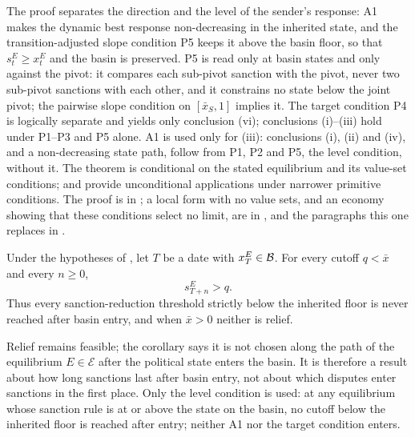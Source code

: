 The proof separates the direction and the level of the sender's response: A1
makes the dynamic best response non-decreasing in the inherited state, and the
transition-adjusted slope condition P5 keeps it above the basin floor, so that
$s_t^E\ge x_t^E$ and the basin is preserved. P5 is read only at basin states
and only against the pivot: it compares each sub-pivot sanction with the pivot,
never two sub-pivot sanctions with each other, and it constrains no state below
the joint pivot; the pairwise slope condition on $[\bar x_S,1]$ implies it. The target
condition P4 is logically
separate and yields only conclusion (vi); conclusions (i)--(iii) hold under
P1--P3 and P5 alone. A1 is used only for (iii): conclusions (i), (ii) and
(iv), and a non-decreasing state path, follow from P1, P2 and P5, the level
condition, without it. The theorem is conditional on the stated equilibrium and
its value-set conditions;  and
 provide unconditional applications under
narrower primitive conditions. The proof is in ; a local form
with no value sets, and an economy showing that these conditions select no limit,
are in , and the paragraphs this one replaces in
.

\begin{corollary}
\label{cor:nontermination}
Under the hypotheses of , let $T$ be a date with
$x_T^E\in\mathcal{B}$. For every cutoff $q<\bar x$ and every $n\ge0$,
\[
s_{T+n}^E>q.
\]
Thus every sanction-reduction threshold strictly below the inherited floor
is never reached after basin entry, and when $\bar x>0$ neither is
relief.
\end{corollary}

Relief remains feasible; the corollary says it is not chosen along the
path of the equilibrium $E\in\mathcal E$ after the political state enters the
basin. It is therefore a result about how long sanctions last after basin entry, not about
which disputes enter sanctions in the first place. Only the level condition
is used: at any equilibrium whose sanction rule is at or above the state on
the basin, no cutoff below the inherited floor is reached after entry;
neither A1 nor the target condition enters.

